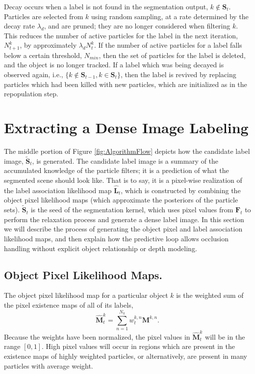 Decay occurs when a label is not found in the segmentation output, $ k \notin \mathbf{S}_t $. Particles are selected from $k$ using random sampling, at a rate determined by the decay rate $\lambda_d$, and are pruned; they are no longer considered when filtering $k$. This reduces the number of active particles for the label in the next iteration, $N^k_{t+1}$, by approximately $\lambda_d N^k_t$. If the number of active particles for a label falls below a certain threshold, $N_{min}$, then the set of particles for the label is deleted, and the object is no longer tracked. If a label which was being decayed is observed again, i.e., $ \{ k\notin \mathbf{S}_{t-1}, k\in \mathbf{S}_{t}\}$, then the label is revived by replacing particles which had been killed with new particles, which are initialized as in the repopulation step.

\section{Extracting a Dense Image Labeling}
\label{sec:Label Image Generation}

The middle portion of Figure \ref{fig:AlgorithmFlow} depicts how the candidate label image,  $\tilde{\mathbf{S}}_{t}$, is generated. The candidate label image is a summary of the accumulated knowledge of the particle filters; it is a prediction of what the segmented scene should look like. That is to say, it is a pixel-wise realization of the label association likelihood map $\mathbf{\hat{L}}_{t}$, which is constructed by combining the object pixel likelihood maps (which approximate the posteriors of the particle sets). $\tilde{\mathbf{S}}_{t}$ is the seed of the segmentation kernel, which uses pixel values from $\mathbf{F}_t$  to perform the relaxation process and generate a dense label image. In this section we will describe the process of generating the object pixel and label association likelihood maps, and then explain how the predictive loop allows occlusion handling without explicit object relationship or depth modeling.

\subsection{Object Pixel Likelihood Maps.}
The object pixel likelihood map for a particular object $k$ is the weighted sum of the pixel existence maps of all of its labels,
\begin{equation}
\label{eqn:PixelLikelihood}
\mathbf{\hat{M}}^{k}_{t} = \sum_{n=1}^{N_k}w^{k,n}_t \mathbf{M}^{k,n} .
\end{equation}
Because the weights have been normalized, the pixel values in $\mathbf{\hat{M}}^{k}_{t}$ will be in the range $[0,1]$. High pixel values will occur in regions which are present in the existence maps of highly weighted particles, or alternatively, are present in many particles with average weight. 

